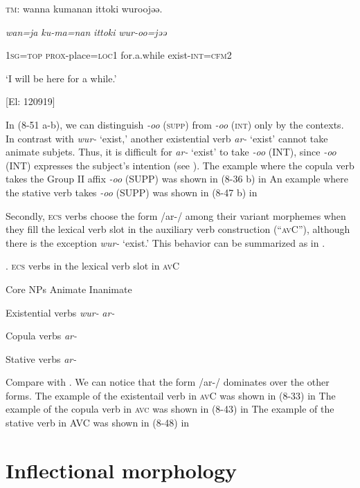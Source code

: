     \textsc{tm}:  wanna  kumanan  {\textbar}ittoki{\textbar}  wuroojəə.

      \textit{wan=ja}  \textit{ku-ma=nan}  \textit{ittoki}  \textit{wur-oo=jəə}

      1\textsc{sg}=\textsc{top}  \textsc{prox}-place=\textsc{loc}1  for.a.while  exist-\textsc{int}=\textsc{cfm}2

      ‘I will be here for a while.’

      [El: 120919]

In (8-51 a-b), we can distinguish \textit{{}-oo} (\textsc{supp}) from \textit{{}-oo} (\textsc{int}) only by the contexts. In contrast with \textit{wur-} ‘exist,’ another existential verb \textit{ar-} ‘exist’ cannot take animate subjets. Thus, it is difficult for \textit{ar{}-} ‘exist’ to take \textit{{}-oo} (INT), since \textit{{}-oo} (INT) expresses the subject’s intention (see ). The example where the copula verb takes the Group II affix \textit{{}-oo} (SUPP) was shown in (8-36 b) in  An example where the stative verb takes \textit{{}-oo} (SUPP) was shown in (8-47 b) in 

  Secondly, \textsc{ecs} verbs choose the form /ar-/ among their variant morphemes when they fill the lexical verb slot in the auxiliary verb construction (“\textsc{av}C”), although there is the exception \textit{wur-} ‘exist.’ This behavior can be summarized as in .

\begin{styleBeschriftung}
\textmd{}\textmd{. \textsc{ecs} verbs in the lexical verb slot in \textsc{av}C}
\end{styleBeschriftung}

Core NPs  Animate  Inanimate

Existential verbs  \textit{wur-}  \textit{ar-}

Copula verbs  \textit{ar-}

Stative verbs  \textit{ar-}

Compare  with . We can notice that the form /ar-/ dominates over the other forms. The example of the existentail verb in \textsc{av}C was shown in (8-33) in  The example of the copula verb in \textsc{avc} was shown in (8-43) in  The example of the stative verb in AVC was shown in (8-48) in 

\section{Inflectional morphology}

